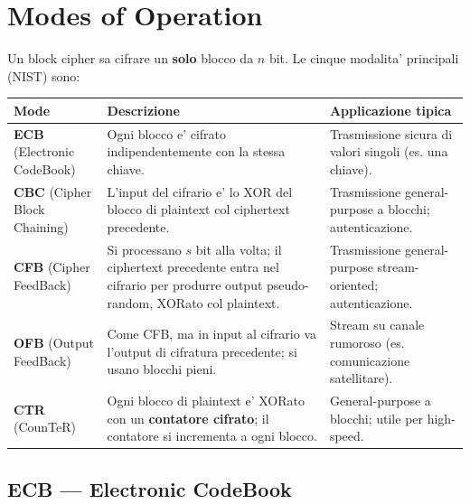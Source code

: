 % 
\chapter{Modes of Operation}
Un block cipher sa cifrare un \textbf{solo} blocco da $ n $ bit.
Le cinque modalita' principali (NIST) sono:
\begin{center}
  \footnotesize
  \begin{tabular}{|l|p{6.2cm}|p{3.8cm}|}
    \hline
    \textbf{Mode} & \textbf{Descrizione} & \textbf{Applicazione tipica} \\ \hline
    \textbf{ECB} (Electronic CodeBook) & Ogni blocco e' cifrato indipendentemente con la stessa chiave. & Trasmissione sicura di valori singoli (es. una chiave). \\ \hline
    \textbf{CBC} (Cipher Block Chaining) & L'input del cifrario e' lo XOR del blocco di plaintext col ciphertext precedente. & Trasmissione general-purpose a blocchi; autenticazione. \\ \hline
    \textbf{CFB} (Cipher FeedBack) & Si processano $ s $ bit alla volta; il ciphertext precedente entra nel cifrario per produrre output pseudo-random, XORato col plaintext. & Trasmissione general-purpose stream-oriented; autenticazione. \\ \hline
    \textbf{OFB} (Output FeedBack) & Come CFB, ma in input al cifrario va l'output di cifratura precedente; si usano blocchi pieni. & Stream su canale rumoroso (es. comunicazione satellitare). \\ \hline
    \textbf{CTR} (CounTeR) & Ogni blocco di plaintext e' XORato con un \textbf{contatore cifrato}; il contatore si incrementa a ogni blocco. & General-purpose a blocchi; utile per high-speed. \\ \hline
  \end{tabular}
\end{center}

\section{ECB — Electronic CodeBook}

